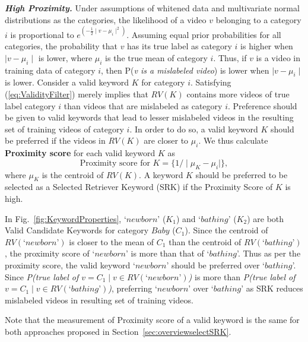 \textbf{\textit{High Proximity.}} Under assumptions of whitened data and multivariate normal distributions as the categories, the likelihood of a video $v$ belonging to a category $i$ is proportional to $e^{(-\frac{1}{2}\mid v-\mu_i \mid^2)}$. Assuming equal prior probabilities for all categories, the probability that $v$ has its true label as category $i$ is higher when $\mid v - \mu_i \mid$ is lower, where $\mu_i$ is the true mean of category $i$. Thus, if $v$ is a video in training data of category $i$, then P(\textit{v is a mislabeled video}) is lower when $\mid v - \mu_i \mid$ is lower. Consider a valid keyword $K$ for category $i$. Satisfying (\ref{eq:ValidityFilter}) merely implies that $RV(K)$ contains more videos of true label category $i$ than videos that are mislabeled as category $i$. Preference should be given to valid keywords that lead to lesser mislabeled videos in the resulting set of training videos of category $i$. In order to do so, a valid keyword $K$ should be preferred if the videos in $RV(K)$ are closer to $\mu_i$. We thus calculate \textbf{Proximity score} for each valid keyword $K$ as 
\begin{equation} \label{eq:proximityscore}
\text{Proximity score for $K$}= \{ 1/\mid \mu_K - \mu_i \mid \}, 
\end{equation}
 where $\mu_K$ is the centroid of $RV(K)$. A keyword $K$ should be preferred to be selected as a Selected Retriever Keyword (SRK) if the Proximity Score of $K$ is high.  

In Fig.~\ref{fig:KeywordProperties}, `$newborn$' ($K_1$) and `$bathing$' ($K_2$) are both Valid Candidate Keywords for category $Baby$ ($C_1$). Since the centroid of $RV(\text{`}newborn\text{'})$ is closer to the mean of $C_1$ than the centroid of $RV(\text{`}bathing\text{'})$, the proximity score of `$newborn$' is more than that of `$bathing$'. Thus as per the proximity score, the valid keyword `$newborn$' should be preferred over `$bathing$'. Since \textit{P(true label of $v =C_1 \mid  v \in RV(\text{`}newborn\text{'})$)} is more than \textit{P(true label of $v =C_1 \mid  v \in RV(\text{`}bathing\text{'})$)}, preferring `$newborn$' over `$bathing$' as SRK reduces mislabeled videos in resulting set of training videos.  

Note that the measurement of Proximity score of a valid keyword is the same for both approaches proposed in Section~\ref{sec:overviewselectSRK}. 

